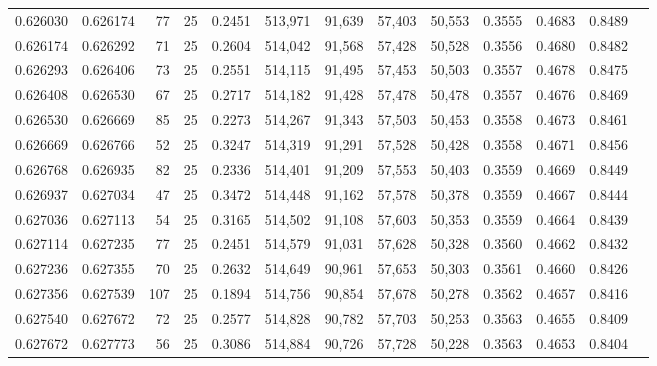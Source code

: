 \begin{tabular}{rrrrrrrrrrrrr}
0.626030 & 0.626174 &    77 &  25 &                                     0.2451 & 513,971 &  91,639 &  57,403 &  50,553 & 0.3555 & 0.4683 & 0.8489 \\
0.626174 & 0.626292 &    71 &  25 &                                     0.2604 & 514,042 &  91,568 &  57,428 &  50,528 & 0.3556 & 0.4680 & 0.8482 \\
0.626293 & 0.626406 &    73 &  25 &                                     0.2551 & 514,115 &  91,495 &  57,453 &  50,503 & 0.3557 & 0.4678 & 0.8475 \\
0.626408 & 0.626530 &    67 &  25 &                                     0.2717 & 514,182 &  91,428 &  57,478 &  50,478 & 0.3557 & 0.4676 & 0.8469 \\
0.626530 & 0.626669 &    85 &  25 &                                     0.2273 & 514,267 &  91,343 &  57,503 &  50,453 & 0.3558 & 0.4673 & 0.8461 \\
0.626669 & 0.626766 &    52 &  25 &                                     0.3247 & 514,319 &  91,291 &  57,528 &  50,428 & 0.3558 & 0.4671 & 0.8456 \\
0.626768 & 0.626935 &    82 &  25 &                                     0.2336 & 514,401 &  91,209 &  57,553 &  50,403 & 0.3559 & 0.4669 & 0.8449 \\
0.626937 & 0.627034 &    47 &  25 &                                     0.3472 & 514,448 &  91,162 &  57,578 &  50,378 & 0.3559 & 0.4667 & 0.8444 \\
0.627036 & 0.627113 &    54 &  25 &                                     0.3165 & 514,502 &  91,108 &  57,603 &  50,353 & 0.3559 & 0.4664 & 0.8439 \\
0.627114 & 0.627235 &    77 &  25 &                                     0.2451 & 514,579 &  91,031 &  57,628 &  50,328 & 0.3560 & 0.4662 & 0.8432 \\
0.627236 & 0.627355 &    70 &  25 &                                     0.2632 & 514,649 &  90,961 &  57,653 &  50,303 & 0.3561 & 0.4660 & 0.8426 \\
0.627356 & 0.627539 &   107 &  25 &                                     0.1894 & 514,756 &  90,854 &  57,678 &  50,278 & 0.3562 & 0.4657 & 0.8416 \\
0.627540 & 0.627672 &    72 &  25 &                                     0.2577 & 514,828 &  90,782 &  57,703 &  50,253 & 0.3563 & 0.4655 & 0.8409 \\
0.627672 & 0.627773 &    56 &  25 &                                     0.3086 & 514,884 &  90,726 &  57,728 &  50,228 & 0.3563 & 0.4653 & 0.8404 \\

\end{tabular}
